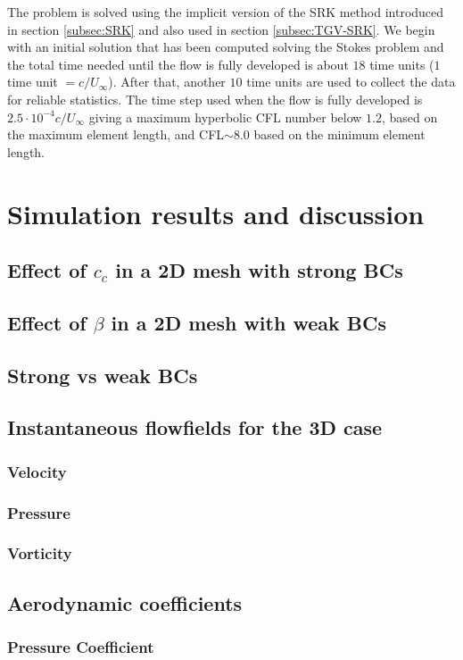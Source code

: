 The problem is solved using the implicit version of the SRK method introduced in section \ref{subsec:SRK} and also used in section \ref{subsec:TGV-SRK}. We begin with an initial solution that has been computed solving the Stokes problem and the total time needed until the flow is fully developed is about $18$ time units ($1$ time unit $=c/U_\infty$). After that, another $10$ time units are used to collect the data for reliable statistics. The time step used when the flow is fully developed is $2.5\cdot10^{-4}c/U_\infty$ giving a maximum hyperbolic CFL number below $1.2$, based on the maximum element length, and CFL$\sim8.0$ based on the minimum element length.

\section{Simulation results and discussion}
\label{sec-C8_results}

\subsection{Effect of $ c_c $ in a 2D mesh with strong BCs}
\subsection{Effect of $ \beta $ in a 2D mesh with weak BCs}
\subsection{Strong vs weak BCs}
\subsection{Instantaneous flowfields for the 3D case}
\subsubsection{Velocity}
\subsubsection{Pressure}
\subsubsection{Vorticity}
\subsection{Aerodynamic coefficients}
\subsubsection{Pressure Coefficient}
